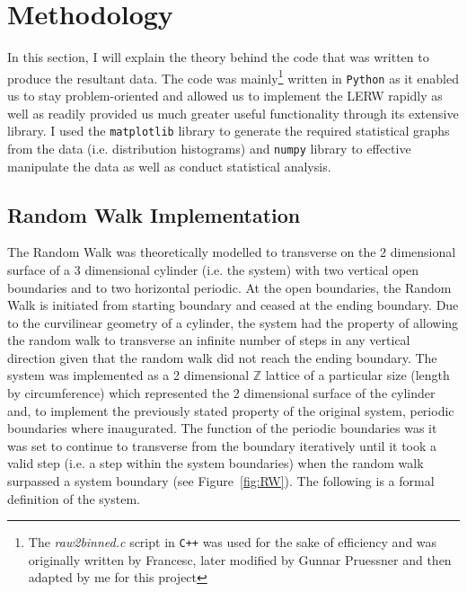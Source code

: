 \documentclass{article}
\begin{document}
\section{Methodology}
	In this section, I will explain the theory behind the code that was written to produce the resultant data. The code was mainly\footnote{The \emph{raw2binned.c} script in \texttt{C++} was used for the sake of efficiency and was originally written by Francesc, later modified by Gunnar Pruessner and then adapted by me for this project} written in \texttt{Python} as it enabled us to stay problem-oriented and allowed us to implement the LERW rapidly as well as readily provided us much greater useful functionality through its extensive library. I used the \texttt{matplotlib} library to generate the required statistical graphs from the data (i.e. distribution histograms) and \texttt{numpy} library to effective manipulate the data as well as conduct statistical analysis.


\subsection{Random Walk Implementation}
	The Random Walk was theoretically modelled to transverse on the 2 dimensional surface of a 3 dimensional cylinder (i.e. the system) with two vertical open boundaries and to two horizontal periodic. At the open boundaries, the  Random Walk is initiated from starting boundary and ceased at the ending boundary. Due to the curvilinear geometry of a cylinder, the system had the property of allowing the random walk to transverse an infinite number of steps in any vertical direction given that the random walk did not reach the ending boundary. 
The system was implemented as a 2 dimensional $\mathbb{Z}$ lattice of a particular size (length by circumference) which represented the 2 dimensional surface of the cylinder and, to implement the previously stated property of the original system, periodic boundaries where inaugurated. The function of the periodic boundaries was it was set to continue to transverse from the boundary iteratively until it took a valid step (i.e. a step within the system boundaries) when the random walk surpassed a system boundary (see Figure~\ref{fig:RW}). The following is a formal definition of the system.
\end{document}
